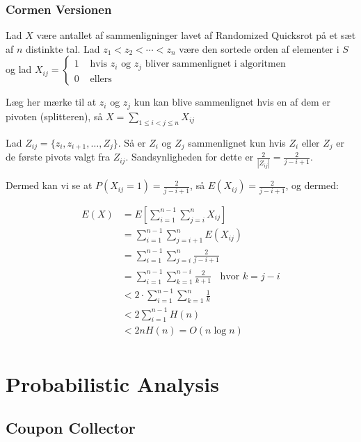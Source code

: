 \documentclass[11pt]{article}
\theoremstyle{definition}
\theoremstyle{remark}
\begin{document}
\subsubsection{Cormen Versionen}

Lad $X$ være antallet af sammenligninger lavet af Randomized Quicksrot på et sæt af $n$ distinkte tal. Lad $z_{1}< z_{2} < \cdots < z_{n}$ være den sortede orden af elementer i $S$ og lad $X_{ij} = \begin{cases}
  1 & \text{ hvis }z_{i} \text{ og }z_{j} \text{ bliver sammenlignet i algoritmen}\\
  0 & \text{ ellers}
\end{cases}$

Læg her mærke til at $z_{i}$ og $z_{j}$ kun kan blive sammenlignet hvis en af dem er pivoten (splitteren), så $X = \sum_{1 \leq i < j \leq n}^{}X_{ij}$

Lad $Z_{ij} = \{z_{i}, z_{i+1}, \ldots, Z_{j}  \}$. Så er $Z_{i}$ og $Z_{j}$ sammenlignet kun hvis $Z_{i}$ eller $Z_{j}$ er de første pivots valgt fra $Z_{ij}$. Sandsynligheden for dette er $\frac{2}{|Z_{ij}|} = \frac{2}{j-i+1}$.

Dermed kan vi se at $P(X_{ij}=1) = \frac{2}{j-i+1}$, så $E(X_{ij}) = \frac{2}{j-i+1}$, og dermed:

\begin{equation}
\begin{split}
  E(X) &= E[ \sum_{i=1}^{n-1}\sum_{j=i}^{n}X_{ij} ]\\
       &= \sum_{i=1}^{n-1}\sum_{j=i+1}^{n} E(X_{ij})\\
       &= \sum_{i=1}^{n-1} \sum_{j=i}^{n} \frac{2}{j-i+1}\\
       &= \sum_{i=1}^{n-1} \sum_{k=1}^{n-i} \frac{2}{k+1} \;\; \text{ hvor } k = j -i\\
       &< 2 \cdot \sum_{i = 1}^{n-1} \sum_{k=1}^{n} \frac{1}{k}\\
       &< 2 \sum_{i=1}^{n-1} H(n)\\
  &< 2 n H(n) = O (n \log n)\\
\end{split}
\end{equation}

\newpage

\section{Probabilistic Analysis}
\label{sec:proban}

\subsection{Coupon Collector}
\end{document}
